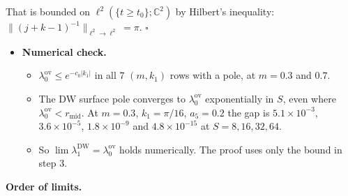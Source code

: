 \documentclass[11pt,a4paper]{article}
\begin{document}
\begin{itemize}
\begin{enumerate}
\begin{itemize}
That is bounded on $\ell^2(\{t \ge t_0\}; \mathbb{C}^2)$ by Hilbert's inequality: $\|(j + k - 1)^{-1}\|_{\ell^2 \to \ell^2} = \pi$. $\square$
\end{itemize}

\end{enumerate}

\begin{itemize}
\item{} {\bfseries\boldmath Numerical check.}
\begin{itemize}
\item{} $\lambda_0^{\text{ov}} \le e^{-c_0|k_1|}$ in all 7 $(m, k_1)$ rows with a pole, at $m = 0.3$ and $0.7$.
\item{} The DW surface pole converges to $\lambda_0^{\text{ov}}$ exponentially in $S$, even where $\lambda_0^{\text{ov}} < r_{\text{mid}}$. At $m = 0.3$, $k_1 = \pi/16$, $a_5 = 0.2$ the gap is $5.1 \times 10^{-3}$, $3.6 \times 10^{-5}$, $1.8 \times 10^{-9}$ and $4.8 \times 10^{-15}$ at $S = 8, 16, 32, 64$.
\item{} So $\lim \lambda_1^{\text{DW}} = \lambda_0^{\text{ov}}$ holds numerically. The proof uses only the bound in step 3.
\end{itemize}

\end{itemize}

\end{itemize}

{\bfseries\boldmath Order of limits.}
\end{document}
